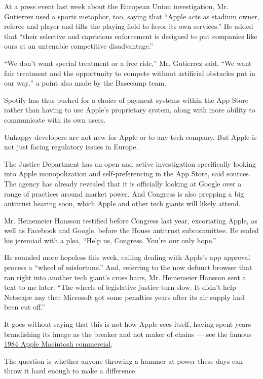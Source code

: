 At a press event last week about the European Union investigation, Mr.
Gutierrez used a sports metaphor, too, saying that ``Apple acts as
stadium owner, referee and player and tilts the playing field to favor
its own services.'' He added that ``their selective and capricious
enforcement is designed to put companies like ours at an untenable
competitive disadvantage.''

``We don't want special treatment or a free ride,'' Mr. Gutierrez said.
``We want fair treatment and the opportunity to compete without
artificial obstacles put in our way,'' a point also made by the Basecamp
team.

Spotify has thus pushed for a choice of payment systems within the App
Store rather than having to use Apple's proprietary system, along with
more ability to communicate with its own users.

Unhappy developers are not new for Apple or to any tech company. But
Apple is not just facing regulatory issues in Europe.

The Justice Department has an open and active investigation specifically
looking into Apple monopolization and self-preferencing in the App
Store, said sources. The agency has already revealed that it is
officially looking at Google over a range of practices around market
power. And Congress is also prepping a big antitrust hearing soon, which
Apple and other tech giants will likely attend.

Mr. Heinemeier Hansson testified before Congress last year, excoriating
Apple, as well as Facebook and Google, before the House antitrust
subcommittee. He ended his jeremiad with a plea, ``Help us, Congress.
You're our only hope.''

He sounded more hopeless this week, calling dealing with Apple's app
approval process a ``wheel of misfortune.'' And, referring to the now
defunct browser that ran right into another tech giant's cross hairs,
Mr. Heinemeier Hansson sent a text to me later: ``The wheels of
legislative justice turn slow. It didn't help Netscape any that
Microsoft got some penalties years after its air supply had been cut
off.''

It goes without saying that this is not how Apple sees itself, having
spent years brandishing its image as the breaker and not maker of chains
--- see the famous
\href{https://www.youtube.com/watch?v=VtvjbmoDx-I}{1984 Apple Macintosh
commercial}.

The question is whether anyone throwing a hammer at power these days can
throw it hard enough to make a difference.

